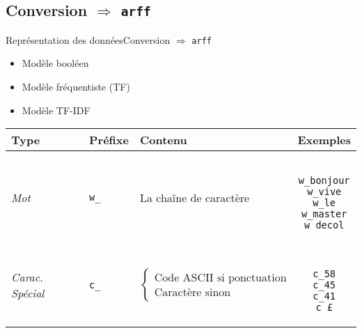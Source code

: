 \subsection{Conversion $\Rightarrow$ \texttt{arff}}
\begin{frame}[containsverbatim]{Représentation des données}{Conversion $\Rightarrow$ \texttt{arff}}
\begin{block}{}
	\begin{itemize}
		\item Modèle booléen
		\item Modèle fréquentiste (TF)
		\item Modèle TF-IDF
	\end{itemize}
\end{block}
\begin{block}{}
\scriptsize
\begin{tabular}{|l|l|l|c|}
\hline
\textbf{Type} & \textbf{Préfixe} & \textbf{Contenu} & \textbf{Exemples} \\
\hline
\textit{Mot} & \verb+w_+ & La chaîne de caractère & \begin{minipage}{2cm}
\begin{verbatim}

w_bonjour
w_vive
w_le
w_master
w_decol

\end{verbatim}
\end{minipage} \\
\hline
\textit{Carac. Spécial} & \verb+c_+ & \begin{minipage}{4.5cm}\begin{displaymath}\begin{cases}
      \textrm{Code ASCII si ponctuation} \\
      \textrm{Caractère sinon}
\end{cases}
\end{displaymath} 
\end{minipage} & \begin{minipage}{2cm}
\begin{verbatim}

c_58
c_45
c_41
c_£

\end{verbatim}
\end{minipage} \\
\hline
\end{tabular}
\end{block}
\end{frame}